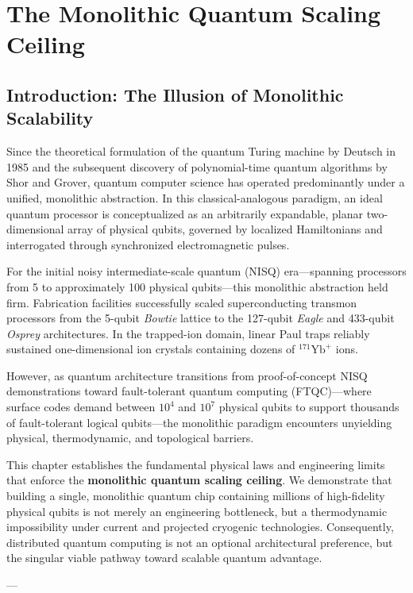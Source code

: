 \chapter{The Monolithic Quantum Scaling Ceiling}
\label{ch:scaling_ceiling}

\section{Introduction: The Illusion of Monolithic Scalability}
Since the theoretical formulation of the quantum Turing machine by Deutsch in 1985 and the subsequent discovery of polynomial-time quantum algorithms by Shor and Grover, quantum computer science has operated predominantly under a unified, monolithic abstraction. In this classical-analogous paradigm, an ideal quantum processor is conceptualized as an arbitrarily expandable, planar two-dimensional array of physical qubits, governed by localized Hamiltonians and interrogated through synchronized electromagnetic pulses.

For the initial noisy intermediate-scale quantum (NISQ) era—spanning processors from 5 to approximately 100 physical qubits—this monolithic abstraction held firm. Fabrication facilities successfully scaled superconducting transmon processors from the 5-qubit \textit{Bowtie} lattice to the 127-qubit \textit{Eagle} and 433-qubit \textit{Osprey} architectures. In the trapped-ion domain, linear Paul traps reliably sustained one-dimensional ion crystals containing dozens of $^{171}\text{Yb}^+$ ions.

However, as quantum architecture transitions from proof-of-concept NISQ demonstrations toward fault-tolerant quantum computing (FTQC)—where surface codes demand between $10^4$ and $10^7$ physical qubits to support thousands of fault-tolerant logical qubits—the monolithic paradigm encounters unyielding physical, thermodynamic, and topological barriers. 

This chapter establishes the fundamental physical laws and engineering limits that enforce the \textbf{monolithic quantum scaling ceiling}. We demonstrate that building a single, monolithic quantum chip containing millions of high-fidelity physical qubits is not merely an engineering bottleneck, but a thermodynamic impossibility under current and projected cryogenic technologies. Consequently, distributed quantum computing is not an optional architectural preference, but the singular viable pathway toward scalable quantum advantage.

---

